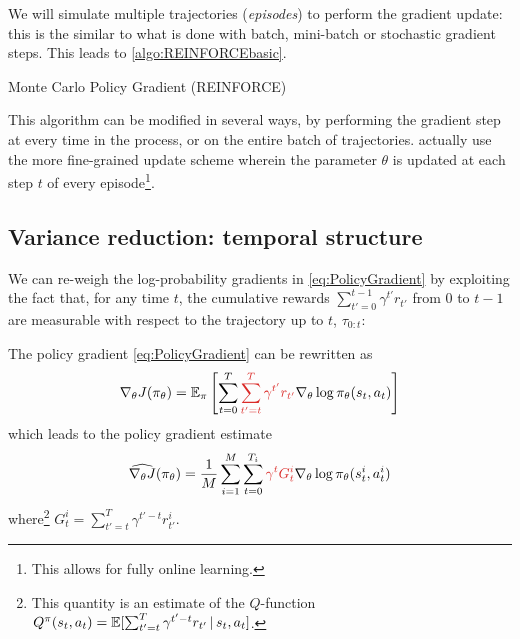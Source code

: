 \documentclass[../course-notes.tex]{subfiles}
\begin{document}
We will simulate multiple trajectories (\textit{episodes}) to perform the gradient update: this is the similar to what is done with batch, mini-batch or stochastic gradient steps. This leads to \cref{algo:REINFORCEbasic}.

\begin{algorithm}[H]
	\caption{Monte Carlo Policy Gradient (REINFORCE)}\label{algo:REINFORCEbasic}
\end{algorithm}

This algorithm can be modified in several ways, by performing the gradient step at every time in the process, or on the entire batch of trajectories. \textcite{Sutton1998} actually use the more fine-grained update scheme wherein the parameter $\theta$ is updated at each step $t$ of every episode\footnote{This allows for fully online learning.}.

\subsection{Variance reduction: temporal structure}


We can re-weigh the log-probability gradients in \cref{eq:PolicyGradient} by exploiting the fact that, for any time $t$, the cumulative rewards $\sum_{t'=0}^{t-1} \gamma^{t'} r_{t'}$ from $0$ to $t-1$ are measurable with respect to the trajectory up to $t$, $\tau_{0:t}$:
\begin{prop}
	The policy gradient \eqref{eq:PolicyGradient} can be rewritten as
	\begin{equation}
	\nabla_\theta J(\pi_\theta) =
	\EE_\pi \left[
	\sum_{t=0}^T
	{\redfont
		\sum_{t'=t}^T \gamma^{t'} r_{t'}
	}
	\nabla_\theta \log\pi_\theta(s_t,a_t)
	\right]
	\end{equation}
	which leads to the policy gradient estimate
	\begin{equation}
	\widehat{\nabla_\theta J}(\pi_\theta) =
	\frac{1}{M}\sum_{i=1}^M
	\sum_{t=0}^{T_i}
	{\redfont \gamma^t G^i_t}
	\nabla_\theta \log\pi_\theta (s_t^i, a_t^i)
	\end{equation}
	where\footnote{This quantity is an estimate of the $Q$-function $Q^\pi(s_t, a_t) = \operatorname{\mathbb{E}} [\sum_{t'=t}^T \gamma^{t'-t} r_{t'} \,|\, s_{t}, a_{t} ]$.} $G^i_t = \sum_{t'=t}^T \gamma^{t'-t} r^i_{t'}$.
\end{prop}
\end{document}
